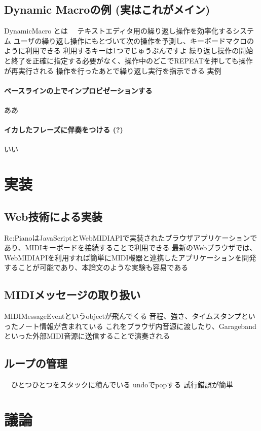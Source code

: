 \documentclass[submit,techreq]{ec2017}
\begin{document}
\subsection{Dynamic Macroの例 (実はこれがメイン)}
  DynamicMacro \cite{Masui:1994:RPK:191666.191722} とは
  　テキストエディタ用の繰り返し操作を効率化するシステム
   ユーザの繰り返し操作にもとづいて次の操作を予測し、キーボードマクロのように利用できる
   利用するキーは1つでじゅうぶんですよ
   繰り返し操作の開始と終了を正確に指定する必要がなく、操作中のどこでREPEATを押しても操作が再実行される
   操作を行ったあとで繰り返し実行を指示できる
  実例
\paragraph*{ベースラインの上でインプロビゼーションする}
ああ
\paragraph*{イカしたフレーズに伴奏をつける (?)}
いい

\section{実装}

\subsection{Web技術による実装}
  Re:PianoはJavaScriptとWebMIDIAPIで実装されたブラウザアプリケーションであり、MIDIキーボードを接続することで利用できる
  最新のWebブラウザでは、WebMIDIAPIを利用すれば簡単にMIDI機器と連携したアプリケーションを開発することが可能であり、本論文のような実験も容易である
\subsection{MIDIメッセージの取り扱い}
  MIDIMessageEventというobjectが飛んでくる
  音程、強さ、タイムスタンプといったノート情報が含まれている
  これをブラウザ内音源に渡したり、Garagebandといった外部MIDI音源に送信することで演奏される
\subsection{ループの管理}
 　ひとつひとつをスタックに積んでいる
  undoでpopする
  試行錯誤が簡単


\section{議論}
\end{document}
